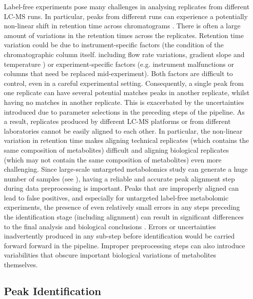 Label-free experiments pose many challenges in analysing replicates from different LC-MS runs. In particular, peaks from different runs can experience a potentially non-linear shift in retention time across chromatograms \cite{Podwojski2009}. There is often a large amount of variations in the retention times across the replicates. Retention time variation could be due to instrument-specific factors (the condition of the chromatographic column itself. including flow rate variations, gradient slope and temperature \cite{Christin2008}) or experiment-specific factors (e.g. instrument malfunctions or columns that need be replaced mid-experiment). Both factors are difficult to control, even in a careful experimental setting. Consequently, a single peak from one replicate can have several potential matches peaks in another replicate, whilst having no matches in another replicate. This is exacerbated by the uncertainties introduced due to parameter selections in the preceding steps of the pipeline. As a result, replicates produced by different LC-MS platforms or from different laboratories cannot be easily aligned to each other. In particular, the non-linear variation in retention time makes aligning technical replicates (which contains the same composition of metabolites) difficult and aligning biological replicates (which may not contain the same composition of metabolites) even more challenging. Since large-scale untargeted metabolomics study can generate a huge number of samples (see \cite{DeVos2007a,Creek2011}), having a reliable and accurate peak alignment step during data preprocessing is important. Peaks that are improperly aligned can lead to false positives, and especially for untargeted label-free metabolomic experiments, the presence of even relatively small errors in any steps preceding the identification stage (including alignment) can result in significant differences to the final analysis and biological conclusions \cite{Chawade2015}. Errors or uncertainties inadvertently produced in any sub-step before identification would be carried forward forward in the pipeline. Improper preprocessing steps can also introduce variabilities that obscure important biological variations of metabolites themselves. 

\subsection{Peak Identification\label{sub:identification-background}}

